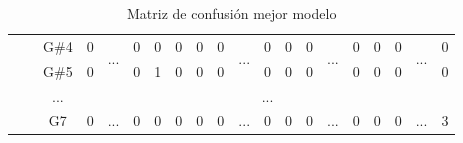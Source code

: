 \documentclass[12pt]{article}
\begin{document}
\begin{table}[H]
{\begin{tabular}{clcccccccccccccccccc}
					   & \multicolumn{1}{l|}{} & \multicolumn{1}{c|}{G\#4} & \multicolumn{1}{c|}{0}    & \multicolumn{1}{c|}{\multirow{2}{*}{...}} & \multicolumn{1}{c|}{0}    & \multicolumn{1}{c|}{0}    & \multicolumn{1}{c|}{0}    & \multicolumn{1}{c|}{0}    & \multicolumn{1}{c|}{0}  & \multicolumn{1}{c|}{\multirow{2}{*}{...}} & \multicolumn{1}{c|}{0}    & \multicolumn{1}{c|}{0}    & \multicolumn{1}{c|}{0}    & \multicolumn{1}{c|}{\multirow{2}{*}{...}} & \multicolumn{1}{c|}{0}  & \multicolumn{1}{c|}{0}  & \multicolumn{1}{c|}{0}  & \multicolumn{1}{c|}{\multirow{2}{*}{...}} & \multicolumn{1}{c|}{0}  \\ \cline{3-4} \cline{6-10} \cline{12-14} \cline{16-18} \cline{20-20} 
					   & \multicolumn{1}{l|}{} & \multicolumn{1}{c|}{G\#5} & \multicolumn{1}{c|}{0}    & \multicolumn{1}{c|}{}                     & \multicolumn{1}{c|}{0}    & \multicolumn{1}{c|}{1}    & \multicolumn{1}{c|}{0}    & \multicolumn{1}{c|}{0}    & \multicolumn{1}{c|}{0}  & \multicolumn{1}{c|}{}                     & \multicolumn{1}{c|}{0}    & \multicolumn{1}{c|}{0}    & \multicolumn{1}{c|}{0}    & \multicolumn{1}{c|}{}                     & \multicolumn{1}{c|}{0}  & \multicolumn{1}{c|}{0}  & \multicolumn{1}{c|}{0}  & \multicolumn{1}{c|}{}                     & \multicolumn{1}{c|}{0}  \\ \cline{3-4} \cline{6-10} \cline{12-14} \cline{16-18} \cline{20-20} 
					   & \multicolumn{1}{l|}{} & \multicolumn{1}{c|}{...}  & \multicolumn{17}{c|}{...}                                                                                                                                                                                                                                                                                                                                                                                                                                                                                                                       \\ \cline{3-4} \cline{6-10} \cline{12-14} \cline{16-18} \cline{20-20} 
					   & \multicolumn{1}{l|}{} & \multicolumn{1}{c|}{G7}   & \multicolumn{1}{c|}{0}    & \multicolumn{1}{c|}{...}                  & \multicolumn{1}{c|}{0}    & \multicolumn{1}{c|}{0}    & \multicolumn{1}{c|}{0}    & \multicolumn{1}{c|}{0}    & \multicolumn{1}{c|}{0}  & \multicolumn{1}{c|}{...}                  & \multicolumn{1}{c|}{0}    & \multicolumn{1}{c|}{0}    & \multicolumn{1}{c|}{0}    & \multicolumn{1}{c|}{...}                  & \multicolumn{1}{c|}{0}  & \multicolumn{1}{c|}{0}  & \multicolumn{1}{c|}{0}  & \multicolumn{1}{c|}{...}                  & \multicolumn{1}{c|}{3}  \\ \cline{3-20} 
\end{tabular}
	}
	\caption{Matriz de confusión mejor modelo}
	\label{Tab:confusion_matrix_6}
\end{table}
\end{document}
